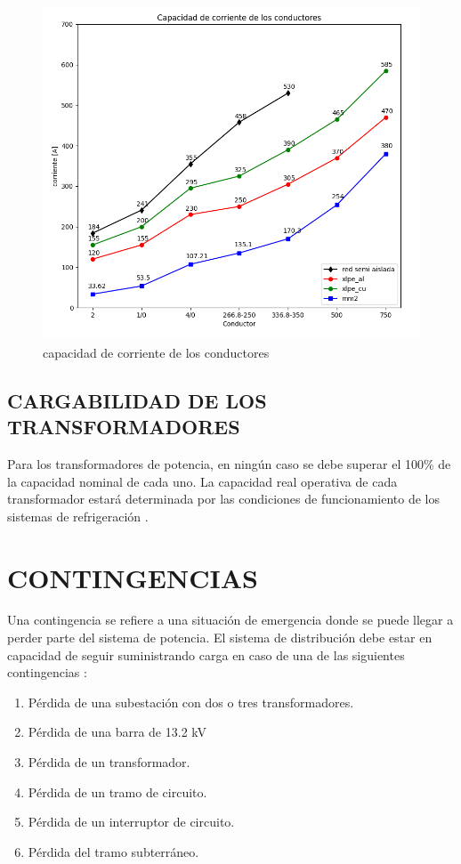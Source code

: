 \documentclass[a5paper]{book}%
\begin{document}
\begin{figure}[H]
  \centering
  
  \caption{capacidad de corriente de los conductores}
  \label{fig:ampacidad}
  \includegraphics[width=\linewidth]{capacidad_corriete}
\end{figure}


\section{CARGABILIDAD DE LOS TRANSFORMADORES}

Para los transformadores de potencia, en ningún caso se debe superar el 100\% de la capacidad nominal de cada uno. La capacidad real operativa de cada transformador estará determinada por las condiciones
de funcionamiento de los sistemas de refrigeración \cite{MANOPEMCALI}.

\chapter{CONTINGENCIAS}


Una contingencia se refiere a una situación de emergencia donde se puede llegar a perder parte del sistema de potencia. El sistema de distribución debe estar en capacidad de seguir suministrando carga en caso de una de las siguientes contingencias \cite{EMCALI2007}:

\begin{enumerate}
	\item Pérdida de una subestación con dos o tres transformadores.
	\item Pérdida de una barra de 13.2 kV
	\item Pérdida de un transformador.
	\item Pérdida de un tramo de circuito.
	\item Pérdida de un interruptor de circuito.
	\item Pérdida del tramo subterráneo.
\end{enumerate}
\end{document}
